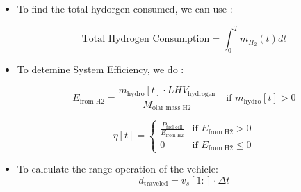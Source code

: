 \documentclass[12pt,a4paper]{article}
\numberwithin{equation}{section}
\begin{document}
{\begin{itemize}
\begin{itemize}
	\item If the function \( f \) is differentiable, the first derivative condition is applied:
	\begin{equation}
		f'(x^*) = 0
	\end{equation}
	
	\item To confirm that \( x^* \) is a local minimum, we use the second derivative condition:
	\begin{equation}
		f''(x^*) > 0
	\end{equation}
	
	\item The optimization algorithm will typically terminate when:
	\begin{itemize}
		\item The change in the objective function value is less than a specified tolerance level, \( \epsilon \):
		\begin{equation}
			|f(x_{k+1}) - f(x_k)| < \epsilon
		\end{equation}
		
		\item The change in \( x \) is less than a specified tolerance level, \( \delta \):
		\begin{equation}
			|x_{k+1} - x_k| < \delta
		\end{equation}
	\end{itemize}
\end{itemize}
\item To find the total hydorgen consumed, we can use :

	\begin{equation}
		\text{Total Hydrogen Consumption} = \int_{0}^{T}\dot{m}_{H_2}(t)dt
	\end{equation}

\item To detemine System Efficiency, we do :

\begin{equation}
	E_{\text{from H2}} = \frac{m_{\text{hydro}}[t] \cdot LHV_{\text{hydrogen}}}{M_{\text{olar mass H2}}} \quad \text{if } m_{\text{hydro}}[t] > 0
\end{equation}

\begin{equation}
	\eta[t] = 
	\begin{cases} 
		\frac{P_{\text{fuel cell}}}{E_{\text{from H2}}} & \text{if } E_{\text{from H2}} > 0 \\
		0 & \text{if } E_{\text{from H2}} \leq 0 
	\end{cases}
\end{equation}
\item To calculate the range operation of the vehicle:
	\begin{equation}
		d_{\text{traveled}} = v_s[1:] \cdot \Delta t
	\end{equation}
	

\end{itemize}}
\end{document}
